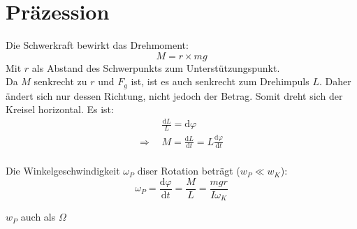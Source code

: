 \section{Präzession}
Die Schwerkraft bewirkt das Drehmoment:
\[
	M=r\times mg
\]
Mit $r$ als Abstand des Schwerpunkts zum Unterstützungspunkt.\\
\newline
Da $M$ senkrecht zu $r$ und $F_g$ ist, ist es auch senkrecht zum Drehimpuls $L$. Daher ändert sich nur dessen Richtung, nicht jedoch der Betrag. Somit dreht sich der Kreisel horizontal. Es ist:
\[
	\begin{split}
		&\frac{\mathrm{d}L}{L}=\mathrm{d}\varphi\\
		\Rightarrow\ \ &M=\frac{\mathrm{d}L}{\mathrm{d}t}=L\frac{\mathrm{d}\varphi}{\mathrm{d}t}
	\end{split}
\]\\
Die Winkelgeschwindigkeit $\omega_P$ diser Rotation beträgt ($w_P\ll w_K$):
\[
	\boxed{
		\omega_P=\frac{\mathrm{d}\varphi}{\mathrm{d}t}=\frac{M}{L}=\frac{mgr}{I\omega_K}
	}
\]
\begin{footnotesize}
	$w_P$ auch als $\Omega$\\
\end{footnotesize} 

\begin{figure}[h!]
\center
{}
\end{figure}
